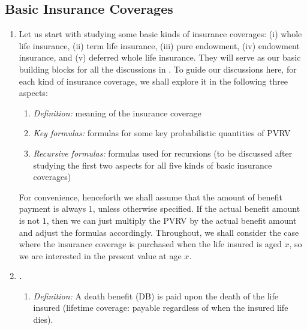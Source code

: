 \subsection{Basic Insurance Coverages}
\label{subsect:basic-insurance}
\begin{enumerate}
\item Let us start with studying some basic kinds of insurance coverages: (i)
whole life insurance, (ii) term life insurance, (iii) pure endowment, (iv)
endowment insurance, and (v) deferred whole life insurance. They will serve as
our basic building blocks for all the discussions in
. To guide our discussions here, for each kind of
insurance coverage, we shall explore it in the following three aspects:
\begin{enumerate}[label={(\arabic*)}]
\item \emph{Definition:} meaning of the insurance coverage
\item \emph{Key formulas:} formulas for some key probabilistic quantities of PVRV
\item \emph{Recursive formulas:} formulas used for recursions (to be discussed
after studying the first two aspects for all five kinds of basic insurance
coverages)
\end{enumerate}
For convenience, henceforth we shall assume that the amount of benefit payment
is always \(1\), unless otherwise specified. If the actual benefit amount is
not \(1\), then we can just multiply the PVRV by the actual benefit amount and
adjust the formulas accordingly. Throughout, we shall consider the case where
the insurance coverage is purchased when the life insured is aged \(x\), so we
are interested in the present value at age \(x\).

\item \textbf{.}
\begin{enumerate}[label={(\arabic*)}]
\item \emph{Definition:} A death benefit (DB) is paid upon the death 
of the life insured (lifetime coverage: payable regardless of when the insured
life dies).



\end{enumerate}
\end{enumerate}
